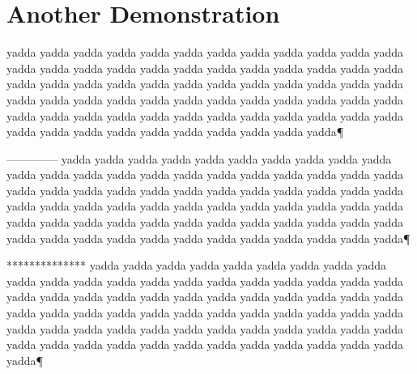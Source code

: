 \chapter{Another Demonstration
}
yadda yadda yadda yadda yadda yadda yadda yadda yadda yadda
yadda yadda yadda yadda yadda yadda yadda yadda yadda yadda
yadda yadda yadda yadda yadda yadda yadda yadda yadda yadda
yadda yadda yadda yadda yadda yadda yadda yadda yadda yadda
yadda yadda yadda yadda yadda yadda yadda yadda yadda yadda
yadda yadda yadda yadda yadda yadda yadda yadda yadda yadda
yadda yadda yadda yadda yadda yadda yadda yadda yadda yadda¶\par

--------------
yadda yadda yadda yadda yadda yadda yadda yadda yadda yadda
yadda yadda yadda yadda yadda yadda yadda yadda yadda yadda
yadda yadda yadda yadda yadda yadda yadda yadda yadda yadda
yadda yadda yadda yadda yadda yadda yadda yadda yadda yadda
yadda yadda yadda yadda yadda yadda yadda yadda yadda yadda
yadda yadda yadda yadda yadda yadda yadda yadda yadda yadda
yadda yadda yadda yadda yadda yadda yadda yadda yadda yadda¶\par

**************
yadda yadda yadda yadda yadda yadda yadda yadda yadda yadda
yadda yadda yadda yadda yadda yadda yadda yadda yadda yadda
yadda yadda yadda yadda yadda yadda yadda yadda yadda yadda
yadda yadda yadda yadda yadda yadda yadda yadda yadda yadda
yadda yadda yadda yadda yadda yadda yadda yadda yadda yadda
yadda yadda yadda yadda yadda yadda yadda yadda yadda yadda
yadda yadda yadda yadda yadda yadda yadda yadda yadda yadda¶\par

